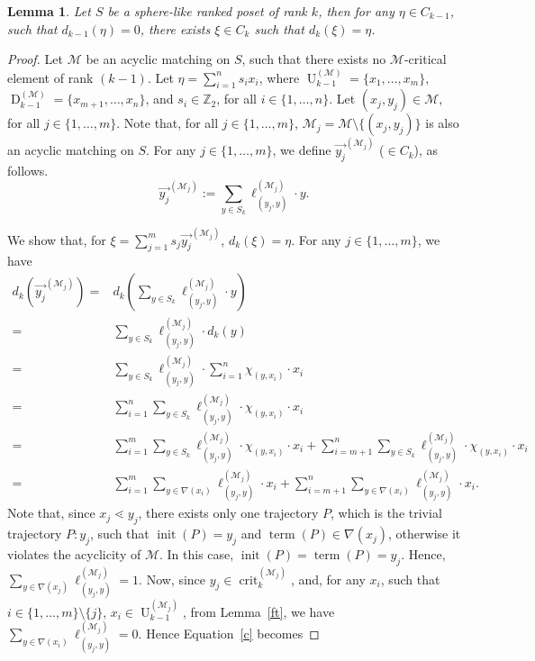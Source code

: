 \documentclass[12pt]{article}
\newtheorem{lemma}[theorem]{Lemma}
\theoremstyle{definition}
\theoremstyle{remark}
\newcommand{\crit}{\operatorname{crit}}
\newcommand{\up}{\operatorname{U}}
\newcommand{\dn}{\operatorname{D}}
\newcommand{\M}{\mathcal{M}}
\begin{document}
     \begin{lemma} \label{bd}
     	Let $S$ be a sphere-like ranked poset of rank $k$, then for any $\eta\in C_{k-1}$, such that $d_{k-1}(\eta)=0$, there exists $\xi\in C_k$ such that $d_k(\xi)=\eta$.
     \end{lemma}
     \begin{proof}
     	Let $\M$ be an acyclic matching on $S$, such that there exists no $\M$-critical element of rank $(k-1)$. Let $\eta=\sum_{i=1}^{n} s_i x_i$, where $\up_{k-1}^{(\M)}=\{x_1,\ldots,x_m\}$, $\dn_{k-1}^{(\M)}=\{x_{m+1},\ldots,x_{n}\}$, and $s_i\in \mathbb{Z}_2$, for all $i \in \{1,\ldots,n\}$.  Let $(x_j,y_j)\in \M$, for all $j\in \{1,\ldots,m\}$.	 Note that, for all $j\in\{1,\ldots,m\}$, $\M_j=\M\setminus\{(x_j,y_j)\}$ is also an acyclic matching on $S$.
     	For any $j\in \{1,\ldots,m\}$, we define $\overrightarrow{y_j}^{(\M_j)}$ ($\in C_k$), as follows.
     	\[ \overrightarrow{y_j}^{(\M_j)}:= \sum_{y\in S_k} \ell^{(\M_j)}_{(y_j,y)}\cdot y.\]
     
     	We show that, for $\xi= \sum_{j=1}^m s_j\overrightarrow{y_j}^{(\M_j)}$, $d_k(\xi)=\eta$. For any $j\in\{1,\ldots,m\}$, we have
     	\begin{align} \label{c}
     		\nonumber	d_k (\overrightarrow{y_j}^{(\M_j)}) =&d_k(\sum_{y\in S_{k}}\ell^{(\M_j)}_{(y_j,y)}\cdot y)\\
     		\nonumber	= & \sum_{y\in S_{k}}\ell^{(\M_j)}_{(y_j,y)}\cdot d_k(y)\\
     		\nonumber	= &\sum_{y\in S_{k}}\ell^{(\M_j)}_{(y_j,y)}\cdot \sum_{i=1}^n \chi_{(y,x_i)} \cdot x_i\\
     		\nonumber	= & \sum_{i=1}^n\sum_{y\in S_{k}}\ell^{(\M_j)}_{(y_j,y)}\cdot \chi_{(y,x_i)} \cdot x_i\\
     	    \nonumber		= & \sum_{i=1}^m\sum_{y\in S_{k}}\ell^{(\M_j)}_{(y_j,y)}\cdot \chi_{(y,x_i)} \cdot x_i+ \sum_{i=m+1}^n\sum_{y\in S_{k}}\ell^{(\M_j)}_{(y_j,y)}\cdot \chi_{(y,x_i)} \cdot x_i\\
     	    		=& \sum_{i=1}^m \sum_{y\in \nabla(x_i)}\ell^{(\M_j)}_{(y_j,y)} \cdot x_i	+ \sum_{i=m+1}^n \sum_{y\in \nabla(x_i)}\ell^{(\M_j)}_{(y_j,y)} \cdot x_i.	
     	\end{align}
   Note that, since $x_j\lessdot y_j$, there exists only one trajectory $P$, which is the trivial trajectory $P: y_j$, such that $\operatorname{init}(P)=y_j$ and $\operatorname{term}(P)\in \nabla(x_j)$, otherwise it violates the acyclicity of $\M$. In this case, $\operatorname{init}(P)=\operatorname{term}(P)=y_j$. Hence, $\sum_{y\in \nabla(x_j)}\ell^{(\M_j)}_{(y_j,y)}=1$. Now, since $y_j \in \crit_k^{(\M_j)}$, and, for any $x_i$, such that $i\in \{1,\ldots,m\}\setminus \{j\}$,  $x_i\in \up_{k-1}^{(\M_j)}$, from Lemma~\ref{ft}, we have $\sum_{y\in \nabla(x_i)}\ell^{(\M_j)}_{(y_j,y)}=0$. Hence Equation~\eqref{c} becomes
     	

\end{proof}
\end{document}
